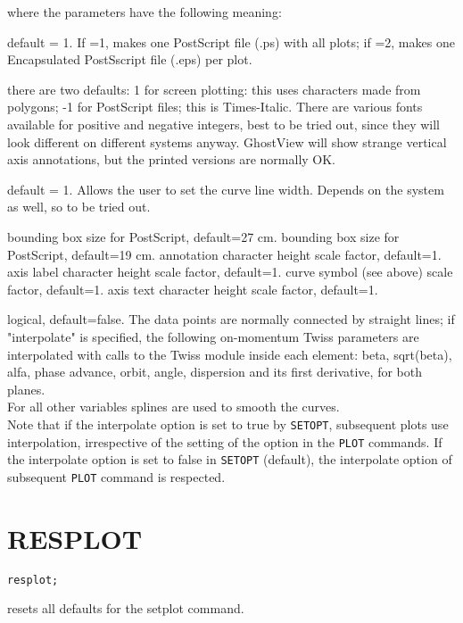 where the parameters have the following meaning: 
\begin{madlist}
    default = 1. If =1, makes one PostScript file (.ps) with
     all plots; if =2, makes one Encapsulated PostSscript file (.eps)
     per plot.   

    there are two defaults: 1 for screen plotting: this uses
     characters made from polygons; -1 for PostScript files; this is
     Times-Italic. There are various fonts available for positive and
     negative integers, best to be tried out, since they will look
     different on different systems anyway. GhostView will show strange
     vertical axis annotations, but the printed versions are normally
     OK.   

    default = 1. Allows the user to set the curve line
     width.  Depends on the system as well, so to be tried out.   

    bounding box size for PostScript, default=27 cm.   
    bounding box size for PostScript, default=19 cm.   
    annotation character height scale factor, default=1.   
    axis label character height scale factor, default=1.  
    curve symbol (see above) scale factor, default=1.  
    axis text character height scale factor, default=1.  

    logical, default=false. The data points are
     normally connected by straight lines; if "interpolate" is
     specified, the following on-momentum Twiss parameters are
     interpolated with calls to the Twiss module inside 
     each element:  beta, sqrt(beta), alfa, phase advance, orbit, angle,
     dispersion and its first derivative, for both planes. \\ 
     For all other variables splines are used to smooth the curves. \\  
     Note that if the interpolate option is set to true by {\tt SETOPT},
     subsequent plots use interpolation, irrespective of the
     setting of the option in the {\tt PLOT} commands. If the interpolate
     option is set to false in {\tt SETOPT} (default), the interpolate
     option of subsequent {\tt PLOT} command is respected.

\end{madlist}


\section{RESPLOT}
\begin{verbatim}
resplot; 
\end{verbatim} 
resets all defaults for the setplot command.  


